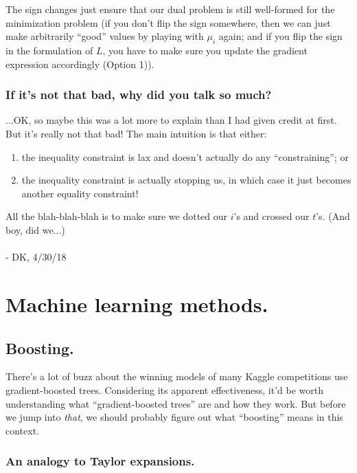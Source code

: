 \documentclass[letterpaper,12pt]{report}
\providecommand{\tightlist}{%
  \setlength{\itemsep}{0pt}\setlength{\parskip}{0pt}}
\begin{document}
The sign changes just ensure that our dual problem is still well-formed
for the minimization problem (if you don't flip the sign somewhere, then
we can just make arbitrarily ``good'' values by playing with \(\mu_i\)
again; and if you flip the sign in the formulation of \(L\), you have to
make sure you update the gradient expression accordingly (Option 1)).

\subsection{If it's not that bad, why did you talk so
much?}\label{if-its-not-that-bad-why-did-you-talk-so-much}

...OK, so maybe this was a lot more to explain than I had given credit
at first. But it's really not that bad! The main intuition is that either:
\begin{enumerate}
  \tightlist
  \item
    the inequality constraint is lax and doesn't actually do any
``constraining''; or 
  \item 
    the inequality constraint is actually stopping us,
    in which case it just becomes another equality constraint!
\end{enumerate}
All the blah-blah-blah is to make sure we dotted our \(i\)'s and crossed
our \(t\)'s. (And boy, did we...)
\\
\\
- DK, 4/30/18

\newpage


\chapter{Machine learning methods.}\label{machine-learning-methods}



\section{Boosting.}\label{boosting}

There's a lot of buzz about the winning models of many Kaggle competitions 
use gradient-boosted trees. Considering its apparent effectiveness, it'd be worth understanding
what ``gradient-boosted trees'' are and how they work. But before we jump into \emph{that}, 
we should probably figure out what ``boosting'' means in this context.

\subsection{An analogy to Taylor expansions.}
\end{document}
